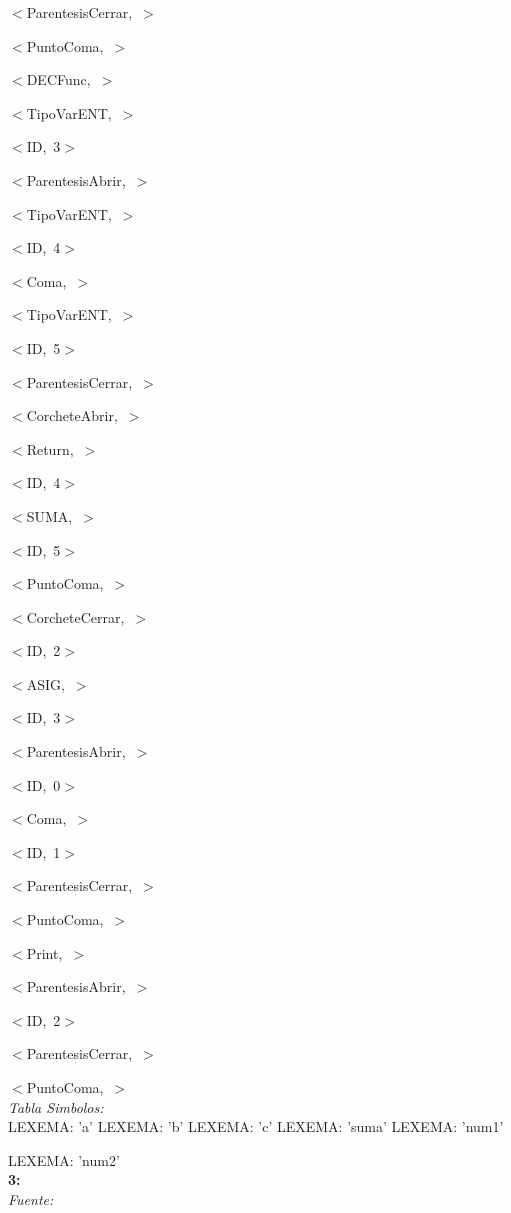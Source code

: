 \documentclass[a4paper, 12pt]{article}
\begin{document}
 
 \mbox{$<$ParentesisCerrar, $>$ }
 
 
 \mbox{$<$PuntoComa, $>$ }
 
 
 \mbox{$<$DECFunc, $>$ }
 
 
 \mbox{$<$TipoVarENT, $>$ }
 
 
 \mbox{$<$ID, 3$>$ }
 
 
 \mbox{$<$ParentesisAbrir, $>$ }
 
 
 \mbox{$<$TipoVarENT, $>$}
 
 
 \mbox{$<$ID, 4$>$ }
 
 
 \mbox{$<$Coma, $>$ }
 
 
 \mbox{$<$TipoVarENT, $>$ }
 
 
 \mbox{$<$ID, 5$>$ }
 
 
 \mbox{$<$ParentesisCerrar, $>$ }
 
 
 \mbox{$<$CorcheteAbrir, $>$ }
 
 
 \mbox{$<$Return, $>$ }
 
 
 \mbox{$<$ID, 4$>$ }
 
 
 \mbox{$<$SUMA, $>$ }
 
 
 \mbox{$<$ID, 5$>$ }
 
 
 \mbox{$<$PuntoComa, $>$ }
 
 
 \mbox{$<$CorcheteCerrar, $>$ }
 
 
 \mbox{$<$ID, 2$>$ }
 
 
 \mbox{$<$ASIG, $>$ }
 
 
 \mbox{$<$ID, 3$>$ }
 
 
 \mbox{$<$ParentesisAbrir, $>$ }
 
 
 \mbox{$<$ID, 0$>$ }
 
 
 \mbox{$<$Coma, $>$ }
 
 
 \mbox{$<$ID, 1$>$ }
 
 
 \mbox{$<$ParentesisCerrar, $>$ }
 
 
 \mbox{$<$PuntoComa, $>$ }
 
 
 \mbox{$<$Print, $>$ }
 
 
 \mbox{$<$ParentesisAbrir, $>$ }
 
 
 \mbox{$<$ID, 2$>$}
 
 
 \mbox{$<$ParentesisCerrar, $>$ }
 
 
 \mbox{$<$PuntoComa, $>$ }\medskip\\
\emph{Tabla Simbolos:}\\ 
  LEXEMA: 'a'
  LEXEMA: 'b'
  LEXEMA: 'c'
  LEXEMA: 'suma'
  LEXEMA: 'num1'
  
  \noindent
  LEXEMA: 'num2'\bigskip\\
 \textbf{3:}\medskip \\
 \emph{Fuente:}
 
\end{document}

